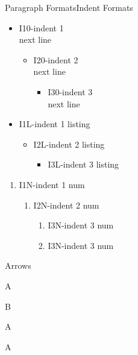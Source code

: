 \documentclass[english,notes]{beamer}
\begin{document}
\begin{frame}{Paragraph Formats}{Indent Formats}
\vspace{1ex}
\begin{itemize}
    \item I10-indent 1\\
    next line
    \begin{itemize}
        \item I20-indent 2\\
        next line
        \begin{itemize}
            \item I30-indent 3\\
            next line
        \end{itemize}
    \end{itemize}
\end{itemize}
\vspace{4ex}
\begin{itemize}
    \item I1L-indent 1 listing
    \begin{itemize}
        \item I2L-indent 2 listing
        \begin{itemize}
            \item I3L-indent 3 listing
        \end{itemize}
    \end{itemize}
\end{itemize}
\vspace{2.2ex}
\begin{enumerate}
    \item I1N-indent 1 num
    \begin{enumerate}
        \item I2N-indent 2 num
        \begin{enumerate}
            \item I3N-indent 3 num
            \item I3N-indent 3 num
        \end{enumerate}
    \end{enumerate}
\end{enumerate}
\end{frame}

\begin{frame}{Arrows}
\begin{arrowlist}
    \item A
    \item B
    \begin{arrowlist}
        \item A
        \begin{arrowlist}
            \item A
        \end{arrowlist}
    \end{arrowlist}
\end{arrowlist}
\end{frame}
\end{document}
